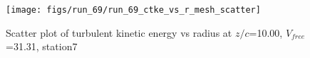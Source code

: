 \begin{figure}[H]
\centering
\texttt{[image: figs/run\_69/run\_69\_ctke\_vs\_r\_mesh\_scatter]}
\caption{Scatter plot of turbulent kinetic energy vs radius at $z/c$=10.00, $V_{free}$=31.31, station7}
\label{fig:run_69_ctke_vs_r_mesh_scatter}
\end{figure}


